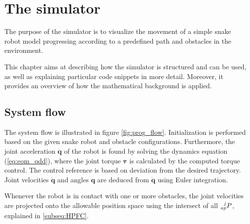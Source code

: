 \chapter{The simulator}

The purpose of the simulator is to visualize the movement of a simple snake robot model progressing according to a predefined path and obstacles in the environment.

This chapter aims at describing how the simulator is structured and can be used, as well as explaining particular code snippets in more detail. Moreover, it provides an overview of how the mathematical background is applied.


\section{System flow}

  The system flow is illustrated in figure \ref{fig:prog_flow}. Initialization is performed based on the given snake robot and obstacle configurations. Furthermore, the joint acceleration $\mathbf{\ddot{q}}$ of the robot is found by solving the dynamics equation (\ref{eq:eom_qdd}), where the joint torque $\boldsymbol{\tau}$ is calculated by the computed torque control. The control reference is based on deviation from the desired trajectory. Joint velocities $\mathbf{\dot{q}}$ and angles $\mathbf{q}$ are deduced from $\mathbf{\ddot{q}}$ using Euler integration.

Whenever the robot is in contact with one or more obstacles, the joint velocities are projected onto the allowable position space using the intersect of all $\prescript{j}{ap}{P}$, explained in \ref{subseq:HPFC}.

